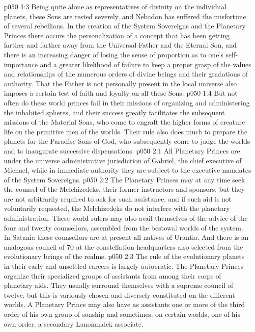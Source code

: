 \vs p050 1:3 Being quite alone as representatives of divinity on the individual planets, these Sons are tested severely, and Nebadon has suffered the misfortune of several rebellions. In the creation of the System Sovereigns and the Planetary Princes there occurs the personalization of a concept that has been getting farther and farther away from the Universal Father and the Eternal Son, and there is an increasing danger of losing the sense of proportion as to one’s self\hyp{}importance and a greater likelihood of failure to keep a proper grasp of the values and relationships of the numerous orders of divine beings and their gradations of authority. That the Father is not personally present in the local universe also imposes a certain test of faith and loyalty on all these Sons.
\vs p050 1:4 But not often do these world princes fail in their missions of organizing and administering the inhabited spheres, and their success greatly facilitates the subsequent missions of the Material Sons, who come to engraft the higher forms of creature life on the primitive men of the worlds. Their rule also does much to prepare the planets for the Paradise Sons of God, who subsequently come to judge the worlds and to inaugurate successive dispensations.
\vs p050 2:1 All Planetary Princes are under the universe administrative jurisdiction of Gabriel, the chief executive of Michael, while in immediate authority they are subject to the executive mandates of the System Sovereigns.
\vs p050 2:2 The Planetary Princes may at any time seek the counsel of the Melchizedeks, their former instructors and sponsors, but they are not arbitrarily required to ask for such assistance, and if such aid is not voluntarily requested, the Melchizedeks do not interfere with the planetary administration. These world rulers may also avail themselves of the advice of the four and twenty counsellors, assembled from the bestowal worlds of the system. In Satania these counsellors are at present all natives of Urantia. And there is an analogous council of 70 at the constellation headquarters also selected from the evolutionary beings of the realms.
\vs p050 2:3 The rule of the evolutionary planets in their early and unsettled careers is largely autocratic. The Planetary Princes organize their specialized groups of assistants from among their corps of planetary aids. They usually surround themselves with a supreme council of twelve, but this is variously chosen and diversely constituted on the different worlds. A Planetary Prince may also have as assistants one or more of the third order of his own group of sonship and sometimes, on certain worlds, one of his own order, a secondary Lanonandek associate.
